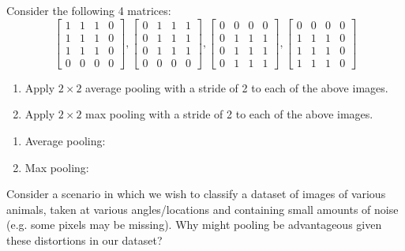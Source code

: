 Consider the following 4 matrices:
$$
\begin{bmatrix}
    1 & 1 & 1 & 0 \\
    1 & 1 & 1 & 0 \\
    1 & 1 & 1 & 0 \\
    0 & 0 & 0 & 0
\end{bmatrix},
%
\begin{bmatrix}
    0 & 1 & 1 & 1 \\
    0 & 1 & 1 & 1 \\
    0 & 1 & 1 & 1 \\
    0 & 0 & 0 & 0
\end{bmatrix},
%
\begin{bmatrix}
	0 & 0 & 0 & 0 \\
    0 & 1 & 1 & 1 \\
    0 & 1 & 1 & 1 \\
    0 & 1 & 1 & 1
\end{bmatrix},
%
\begin{bmatrix}
    0 & 0 & 0 & 0 \\
    1 & 1 & 1 & 0 \\
    1 & 1 & 1 & 0 \\
    1 & 1 & 1 & 0
\end{bmatrix}
$$
\problem[3]

\begin{enumerate}
    \item Apply $2 \times 2$ average pooling with a stride of 2 to each of the above images.
    \item Apply $2 \times 2$ max pooling with a stride of 2 to each of the above images.
\end{enumerate}

\begin{subsolution}
\begin{enumerate}
    \item Average pooling:
    \item Max pooling:
\end{enumerate}
\end{subsolution}


\problem[4]

Consider a scenario in which we wish to classify a dataset of images of various animals, taken at various angles/locations and containing small amounts of noise (e.g. some pixels may be missing). Why might pooling be advantageous given these distortions in our dataset?

\begin{subsolution}

\end{subsolution}

